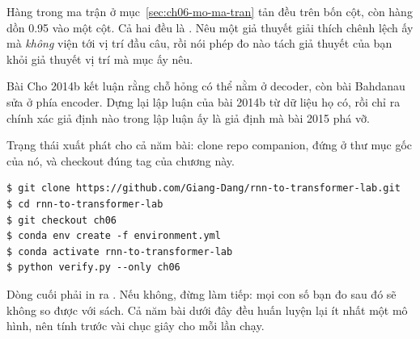 \begin{bt}
  \item Hàng  trong ma trận ở mục~\ref{sec:ch06-mo-ma-tran} tản đều
    trên bốn cột, còn hàng  dồn 0.95 vào một cột. Cả hai đều là
    . Nêu một giả thuyết giải thích chênh lệch ấy mà
    \emph{không} viện tới vị trí đầu câu, rồi nói phép đo nào tách giả thuyết
    của bạn khỏi giả thuyết vị trí mà mục ấy nêu.

  \item Bài Cho 2014b kết luận rằng chỗ hỏng có thể nằm ở decoder, còn bài
    Bahdanau sửa ở phía encoder. Dựng lại lập luận của bài 2014b từ dữ liệu họ
    có, rồi chỉ ra chính xác giả định nào trong lập luận ấy là giả định mà bài
    2015 phá vỡ.
\end{bt}

\tierapply

Trạng thái xuất phát cho cả năm bài: clone repo companion, đứng ở thư mục gốc
của nó, và checkout đúng tag của chương này.

\begin{verbatim}
$ git clone https://github.com/Giang-Dang/rnn-to-transformer-lab.git
$ cd rnn-to-transformer-lab
$ git checkout ch06
$ conda env create -f environment.yml
$ conda activate rnn-to-transformer-lab
$ python verify.py --only ch06
\end{verbatim}

Dòng cuối phải in ra . Nếu không, đừng làm tiếp: mọi con số
bạn đo sau đó sẽ không so được với sách. Cả năm bài dưới đây đều huấn luyện lại
ít nhất một mô hình, nên tính trước vài chục giây cho mỗi lần chạy.

